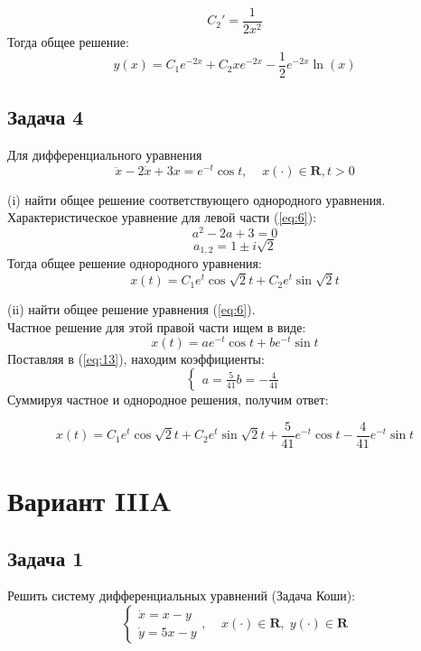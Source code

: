 \documentclass[a4paper, 12pt]{article}
\begin{document}
\[C_2' = \frac 1  {2x^2}\]
Тогда общее решение:
\[y(x) = C_1e^{-2x}+C_2xe^{-2x}-\frac 1 2 e^{-2x}\ln(x)\]


	\subsection {Задача 4}

Для дифференциального уравнения
\begin{equation}
\ddot{x}-2\dot{x}+3x=e^{-t}\cos{t}, \;\;\;\; x(\cdot)\in \textbf{R}, t>0
\label{eq:13}
\end{equation}

(i) найти общее решение соответствующего однородного уравнения.\\
Характеристическое уравнение для левой части (\ref{eq:6}):
\[a^2-2a+3=0\]
\[a_{1,2}=1 \pm i\sqrt{2}\]
Тогда общее решение однородного уравнения:
\begin{equation}
x(t) = C_1e^t\cos{\sqrt{2}t}+C_2e^t\sin{\sqrt{2}t}
\label{eq:7}
\end{equation}

(ii) найти общее решение уравнения (\ref{eq:6}).\\
Частное решение для этой правой части ищем в виде:
\[ x(t) = ae^{-t}\cos{t}+be^{-t}\sin{t}\]
Поставляя в (\ref{eq:13}), находим коэффициенты: 
\[
\left\{
\begin{array}{lr}
a =\frac 5 {41}
b = -  \frac 4 {41}
\end{array}
\right.
\]
Суммируя частное и однородное решения, получим ответ:

\[x(t) =  C_1e^t\cos{\sqrt{2}t}+C_2e^t\sin{\sqrt{2}t}+\frac {5} {41} e^{-t}\cos{t}-\frac {4}{41}e^{-t}\sin{t} \]


	\section{Вариант IIIA}
		\subsection {Задача 1}


 Решить систему дифференциальных уравнений (Задача Коши): 
\begin{equation}
\left\{
\begin{array}{lr}
\dot{x} = x-y\\
\dot{y} = 5x-y
\end{array}
\right.
, \;\;\;\; x(\cdot)\in \textbf{R},\; y(\cdot)\in \textbf{R}
\label{eq:14}
\end{equation}
\end{document}

